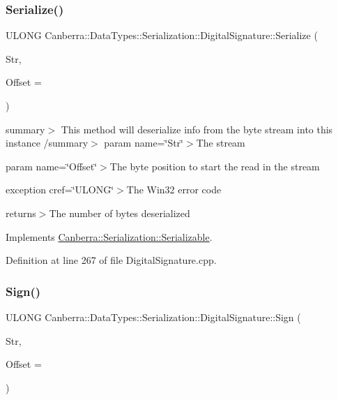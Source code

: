 \subsubsection{\texorpdfstring{Serialize()}{Serialize()}}
{\footnotesize\ttfamily U\+L\+O\+NG Canberra\+::\+Data\+Types\+::\+Serialization\+::\+Digital\+Signature\+::\+Serialize (\begin{DoxyParamCaption}\item[{\hyperlink{class_canberra_1_1_utility_1_1_core_1_1_byte_stream}{Canberra\+::\+Utility\+::\+Core\+::\+Byte\+Stream} \&}]{Str,  }\item[{const L\+O\+NG}]{Offset = {} }\end{DoxyParamCaption})\hspace{0.3cm}{\ttfamily [virtual]}}

summary$>$ This method will deserialize info from the byte stream into this instance /summary$>$ param name=\char`\"{}\+Str\char`\"{}$>$The stream

param name=\char`\"{}\+Offset\char`\"{}$>$The byte position to start the read in the stream

exception cref=\char`\"{}\+U\+L\+O\+N\+G\char`\"{}$>$The Win32 error code

returns$>$The number of bytes deserialized

Implements \hyperlink{class_canberra_1_1_serialization_1_1_serializable}{Canberra\+::\+Serialization\+::\+Serializable}.



Definition at line 267 of file Digital\+Signature.\+cpp.

\mbox{\label{class_canberra_1_1_data_types_1_1_serialization_1_1_digital_signature_a921db506de54c50ea512a93d7da67b24_a921db506de54c50ea512a93d7da67b24}} 
\subsubsection{\texorpdfstring{Sign()}{Sign()}}
{\footnotesize\ttfamily U\+L\+O\+NG Canberra\+::\+Data\+Types\+::\+Serialization\+::\+Digital\+Signature\+::\+Sign (\begin{DoxyParamCaption}\item[{const \hyperlink{class_canberra_1_1_utility_1_1_core_1_1_byte_stream}{Canberra\+::\+Utility\+::\+Core\+::\+Byte\+Stream} \&}]{Str,  }\item[{const L\+O\+NG}]{Offset = {} }\end{DoxyParamCaption})}

